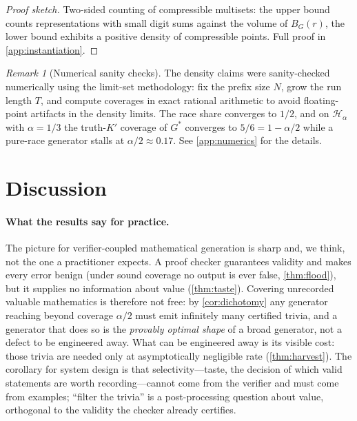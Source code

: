 \documentclass[11pt]{article}
\numberwithin{equation}{section}
\newcommand{\mc}[1]{\mathcal{#1}}
\newcommand{\Hcal}{\mc{H}}
\newcommand{\Hfam}{\Hcal_{\alpha}}
\theoremstyle{plain}
\theoremstyle{definition}
\theoremstyle{remark}
\newtheorem{remark}[theorem]{Remark}
\begin{document}
\begin{proof}[Proof sketch]
Two-sided counting of compressible multisets: the upper bound counts representations with
small digit sums against the volume of $B_G(r)$, the lower bound exhibits a positive density
of compressible points. Full proof in \cref{app:instantiation}.
\end{proof}

\begin{remark}[Numerical sanity checks]\label{rmk:numerics}
The density claims were sanity-checked numerically using the limit-set methodology: fix the
prefix size $N$, grow the run length $T$, and compute coverages in exact rational arithmetic
to avoid floating-point artifacts in the density limits. The race share converges to $1/2$,
and on $\Hfam$ with $\alpha = 1/3$ the truth-$K'$ coverage of $G^*$ converges to $5/6 = 1 -
\alpha/2$ while a pure-race generator stalls at $\alpha/2 \approx 0.17$. See
\cref{app:numerics} for the details.
\end{remark}

\section{Discussion}
\label{sec:discussion}

\paragraph{What the results say for practice.}
The picture for verifier-coupled mathematical generation is sharp and, we think, not the one a
practitioner expects. A proof checker guarantees validity and makes every error benign (under
sound coverage no output is ever false, \cref{thm:flood}), but it supplies no information
about value (\cref{thm:taste}). Covering unrecorded valuable mathematics is therefore not
free: by \cref{cor:dichotomy} any generator reaching beyond coverage $\alpha/2$ must emit
infinitely many certified trivia, and a generator that does so is the \emph{provably optimal
shape} of a broad generator, not a defect to be engineered away. What can be engineered away
is its visible cost: those trivia are needed only at asymptotically negligible rate
(\cref{thm:harvest}). The corollary for system design is that selectivity---taste, the
decision of which valid statements are worth recording---cannot come from the verifier and
must come from examples; ``filter the trivia'' is a post-processing question about value,
orthogonal to the validity the checker already certifies.
\end{document}
